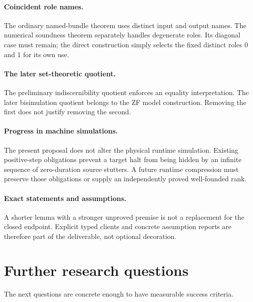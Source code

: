 \documentclass[11pt,letterpaper]{article}
\theoremstyle{definition}
\theoremstyle{remark}
\begin{document}
\paragraph{Coincident role names.}
The ordinary named-bundle theorem uses distinct input and output names. The
numerical soundness theorem separately handles degenerate roles. Its diagonal
case must remain; the direct construction simply selects the fixed distinct
roles 0 and 1 for its own use.

\paragraph{The later set-theoretic quotient.}
The preliminary indiscernibility quotient enforces an equality interpretation.
The later bisimulation quotient belongs to the ZF model construction. Removing
the first does not justify removing the second.

\paragraph{Progress in machine simulations.}
The present proposal does not alter the physical runtime simulation. Existing
positive-step obligations prevent a target halt from being hidden by an infinite
sequence of zero-duration source stutters. A future runtime compression must
preserve those obligations or supply an independently proved well-founded rank.

\paragraph{Exact statements and assumptions.}
A shorter lemma with a stronger unproved premise is not a replacement for the
closed endpoint. Explicit typed clients and concrete assumption reports are
therefore part of the deliverable, not optional decoration.

\section{Further research questions}

The next questions are concrete enough to have measurable success criteria.
\end{document}
